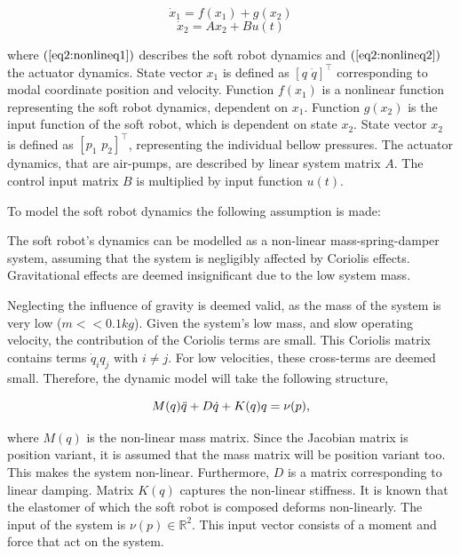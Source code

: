 \begin{equation}
    \dot{x}_1  = f(x_1) + g(x_2) 
       \label{eq2:nonlineq1}
    \end{equation}
    \begin{equation}
    \dot{x}_2 = Ax_2 + Bu(t)  
    \label{eq2:nonlineq2}
\end{equation}

where $(\ref{eq2:nonlineq1})$ describes the soft robot dynamics and $(\ref{eq2:nonlineq2})$ the actuator dynamics. State vector $x_1$ is defined as $[ q \hspace{4pt} \dot{q} ]^\top$ corresponding to modal coordinate position and velocity. Function $f(x_1)$ is a nonlinear function representing the soft robot dynamics, dependent on $x_1$. Function $g(x_2)$ is the input function of the soft robot, which is dependent on state $x_2$. State vector $x_2$ is defined as $[ p_1 \hspace{4pt} p_2 ]^\top$, representing the individual bellow pressures. The actuator dynamics, that are air-pumps, are described by linear system matrix $A$. The control input matrix $B$ is multiplied by input function $u(t)$.

To model the soft robot dynamics the following assumption is made:

\begin{theorem}
The soft robot's dynamics can be modelled as a non-linear mass-spring-damper system, assuming that the system is negligibly affected by Coriolis effects. Gravitational effects are deemed insignificant due to the low system mass.
\end{theorem}

Neglecting the influence of gravity is deemed valid, as the mass of the system is very low ($m << 0.1 kg$). Given the system's low mass, and slow operating velocity, the contribution of the Coriolis terms are small. This Coriolis matrix contains terms $\dot{q}_i q_j$ with $i \neq j$. For low velocities, these cross-terms are deemed small. Therefore, the dynamic model will take the following structure,


\begin{equation}
    M(q)\Ddot{q} + D\dot{q} + K(q)q = \nu(p),
    \label{eq2:simp_model}
\end{equation}


where $M(q)$ is the non-linear mass matrix. Since the Jacobian matrix is position variant, it is assumed that the mass matrix will be position variant too. This makes the system non-linear. Furthermore, $D$ is a matrix corresponding to linear damping. Matrix $K(q)$ captures the non-linear stiffness. It is known that the elastomer of which the soft robot is composed deforms non-linearly. The input of the system is $\nu(p) \in \mathbb{R}^2$. This input vector consists of a moment and force that act on the system. 

